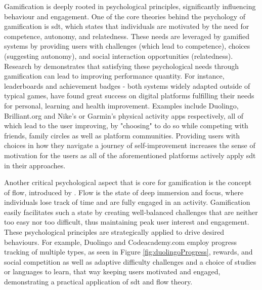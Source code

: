 Gamification is deeply rooted in psychological principles, significantly influencing behaviour and engagement. 
One of the core theories behind the psychology of gamification is \textcite{sdt} \acrshort{sdt}, which states that individuals are motivated by the need for competence, autonomy, and relatedness. 
These needs are leveraged by gamified systems by providing users with challenges (which lead to competence), choices (suggesting autonomy), and social interaction opportunities (relatedness). 
Research by \textcite{MEKLER2017525}demonstrates that satisfying these psychological needs through gamification can lead to improving performance quantity. 
For instance, leaderboards and achievement badges - both systems widely adapted outside of typical games, have found great success on digital platforms fulfilling their needs for personal, learning and health improvement. 
Examples include Duolingo, Brilliant.org and Nike's or Garmin's physical activity apps respectively, all of which lead to the user improving, by "choosing" to do so while competing with friends, family circles as well as platform communities. 
Providing users with choices in how they navigate a journey of self-improvement increases the sense of motivation for the users as all of the aforementioned platforms actively apply \acrshort{sdt} in their approaches.

Another critical psychological aspect that is core for gamification is the concept of flow, introduced by \textcite{flow}. 
Flow is the state of deep immersion and focus, where individuals lose track of time and are fully engaged in an activity. 
Gamification easily facilitates such a state by creating well-balanced challenges that are neither too easy nor too difficult, thus maintaining peak user interest and engagement. 
These psychological principles are strategically applied to drive desired behaviours. 
For example, Duolingo and Codeacademy.com employ progress tracking of multiple types, as seen in Figure \ref{fig:duolingoProgress}, rewards, and social competition as well as adaptive difficulty challenges and a choice of studies or languages to learn, that way keeping users motivated and engaged, demonstrating a practical application of \acrshort{sdt} and flow theory.

